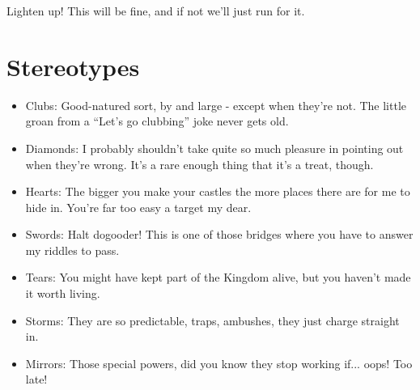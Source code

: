 Lighten up! This will be fine, and if not we'll just run for it.

\section*{Stereotypes}

\begin{itemize}

\item Clubs: Good-natured sort, by and large - except when they're not. The little groan from a “Let’s go clubbing” joke never gets old.
\item Diamonds: I probably shouldn't take quite so much pleasure in pointing out when they’re wrong. It’s a rare enough thing that it’s a treat, though.
\item Hearts: The bigger you make your castles the more places there are for me to hide in. You're far too easy a target my dear.
\item Swords: Halt dogooder! This is one of those bridges where you have to answer my riddles to pass.
\item Tears: You might have kept part of the Kingdom alive, but you haven't made it worth living. 
\item Storms: They are so predictable, traps, ambushes, they just charge straight in. 
\item Mirrors: Those special powers, did you know they stop working if... oops! Too late!


\end{itemize}

